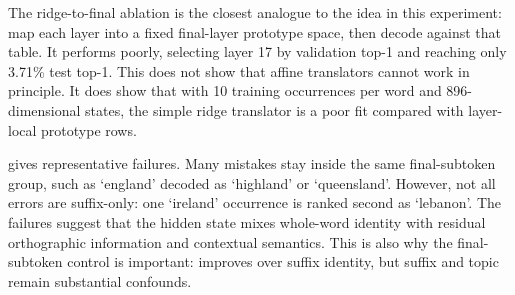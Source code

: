 The ridge-to-final ablation is the closest analogue to the \tunedlens idea in this experiment: map each layer into a fixed final-layer prototype space, then decode against that table. It performs poorly, selecting layer 17 by validation top-1 and reaching only 3.71\% test top-1. This does not show that affine translators cannot work in principle. It does show that with 10 training occurrences per word and 896-dimensional states, the simple ridge translator is a poor fit compared with layer-local prototype rows.

 gives representative failures. Many mistakes stay inside the same final-subtoken group, such as `england' decoded as `highland' or `queensland'. However, not all errors are suffix-only: one `ireland' occurrence is ranked second as `lebanon'. The failures suggest that the hidden state mixes whole-word identity with residual orthographic information and contextual semantics. This is also why the final-subtoken control is important: \itl improves over suffix identity, but suffix and topic remain substantial confounds.



